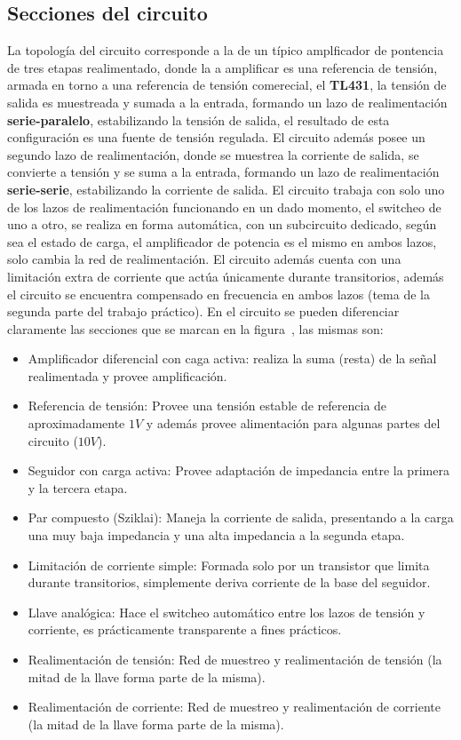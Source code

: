 
\subsection{Secciones del circuito}


\normalfont

La topología del circuito corresponde a la de un típico amplficador de pontencia de tres etapas realimentado, donde la  a amplificar es una referencia de tensión, armada en torno a una referencia de tensión comerecial, el \textbf{TL431}, la tensión de salida es muestreada y sumada a la entrada, formando un lazo de realimentación \textbf{serie-paralelo}, estabilizando la tensión de salida, el resultado de esta configuración es una fuente de tensión regulada. El circuito además posee un segundo lazo de realimentación, donde se muestrea la corriente de salida, se convierte a tensión y se suma a la entrada, formando un lazo de realimentación \textbf{serie-serie}, estabilizando la corriente de salida. El circuito trabaja con solo uno de los lazos de realimentación funcionando en un dado momento, el switcheo de uno a otro, se realiza en forma automática, con un subcircuito dedicado, según sea el estado de carga, el amplificador de potencia es el mismo en ambos lazos, solo cambia la red de realimentación. El circuito además cuenta con una limitación extra de corriente que actúa únicamente durante transitorios, además el circuito se encuentra compensado en frecuencia en ambos lazos (tema de la segunda parte del trabajo práctico).
En el circuito se pueden diferenciar claramente las secciones que se marcan en la figura~, las mismas son:


\begin{itemize}
\item Amplificador diferencial con caga activa: realiza la suma (resta) de la señal realimentada y provee amplificación.
\item Referencia de tensión: Provee una tensión estable de referencia de aproximadamente $1 V$ y además provee alimentación para algunas partes del circuito ($10 V$).
\item Seguidor con carga activa: Provee adaptación de impedancia entre la primera y la tercera etapa.
\item Par compuesto (Sziklai): Maneja la corriente de salida, presentando a la carga una muy baja impedancia y una alta impedancia a la segunda etapa.
\item Limitación de corriente simple: Formada solo por un transistor que limita durante transitorios, simplemente deriva corriente de la base del seguidor.
\item Llave analógica: Hace el switcheo automático entre los lazos de tensión y corriente, es prácticamente transparente a fines prácticos.
\item Realimentación de tensión: Red de muestreo y realimentación de tensión (la mitad de la llave forma parte de la misma).
\item Realimentación de corriente: Red de muestreo y realimentación de corriente (la mitad de la llave forma parte de la misma).
\end{itemize}

